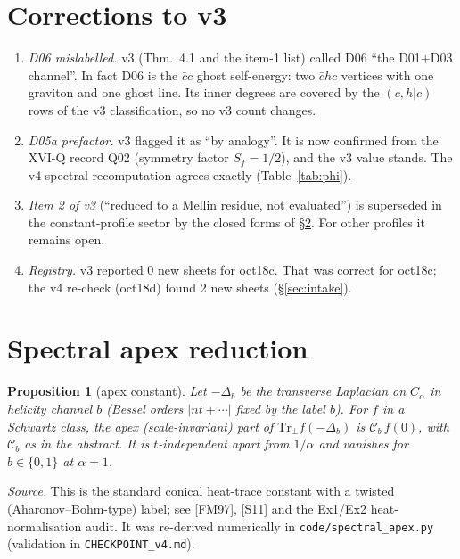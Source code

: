\documentclass[11pt]{article}
\newtheorem{proposition}[theorem]{Proposition}
\theoremstyle{definition}
\newcommand{\Ccb}{\mathcal C}
\begin{document}
\section{Corrections to v3}\label{sec:corr}
\begin{enumerate}
\item \emph{D06 mislabelled.} v3 (Thm.~4.1 and the item-1 list) called D06 ``the D01$+$D03 channel''. In fact D06 is the $\bar cc$ ghost self-energy: two $\bar c h c$ vertices with one graviton and one ghost line. Its inner degrees are covered by the $(c,h|c)$ rows of the v3 classification, so no v3 count changes.
\item \emph{D05a prefactor.} v3 flagged it as ``by analogy''. It is now confirmed from the XVI-Q record Q02 (symmetry factor $S_f=1/2$), and the v3 value stands. The v4 spectral recomputation agrees exactly (Table~\ref{tab:phi}).
\item \emph{Item 2 of v3} (``reduced to a Mellin residue, not evaluated'') is superseded in the constant-profile sector by the closed forms of \S\ref{sec:spec}. For other profiles it remains open.
\item \emph{Registry.} v3 reported 0 new sheets for oct18c. That was correct for oct18c; the v4 re-check (oct18d) found 2 new sheets (\S\ref{sec:intake}).
\end{enumerate}

\section{Spectral apex reduction}\label{sec:spec}
\begin{proposition}[apex constant]\label{prop:C}
Let $-\Delta_b$ be the transverse Laplacian on $C_\alpha$ in helicity channel $b$ (Bessel orders $|n t+\cdots|$ fixed by the label $b$). For $f$ in a Schwartz class, the apex (scale-invariant) part of $\mathrm{Tr}_\perp f(-\Delta_b)$ is $\Ccb_b\,f(0)$, with $\Ccb_b$ as in the abstract. It is $t$-independent apart from $1/\alpha$ and vanishes for $b\in\{0,1\}$ at $\alpha=1$.
\end{proposition}
\emph{Source.} This is the standard conical heat-trace constant with a twisted (Aharonov--Bohm-type) label; see [FM97], [S11] and the Ex1/Ex2 heat-normalisation audit. It was re-derived numerically in \texttt{code/spectral\_apex.py} (validation in \texttt{CHECKPOINT\_v4.md}).
\end{document}
